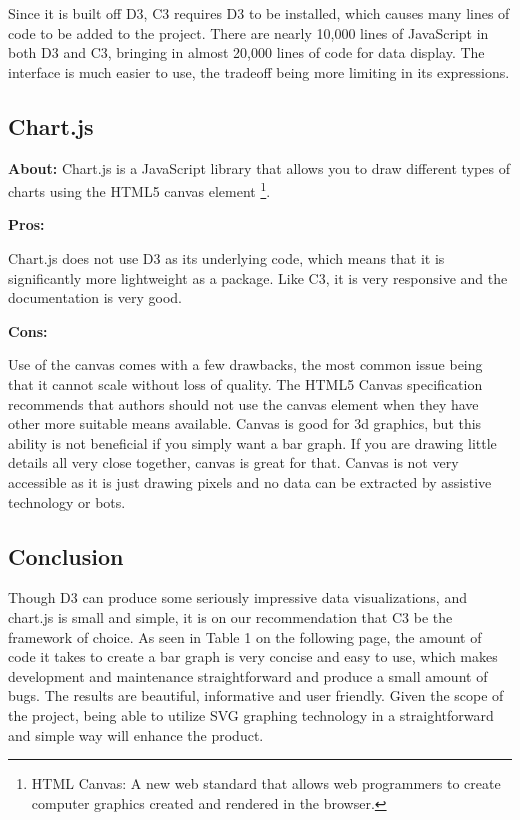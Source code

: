 \documentclass[draftclsnofoot,onecolumn,letterpaper,10pt,compsoc]{IEEEtran}
\begin{document}
  Since it is built off D3, C3 requires D3 to be installed, which causes many lines of code to be added to the project.
  There are nearly 10,000 lines of JavaScript in both D3 and C3, bringing in almost 20,000 lines of code for data display.
  The interface is much easier to use, the tradeoff being more limiting in its expressions.


  \subsection{Chart.js}
  \textbf{About:}
  Chart.js is a JavaScript library that allows you to draw different types of charts using the HTML5 canvas element
  \footnote{HTML Canvas: A new web standard that allows web programmers to create computer graphics created and rendered in the browser.}.

  \textbf{Pros:}

  Chart.js does not use D3 as its underlying code, which means that it is significantly more lightweight as a package.\cite{ChartJS} Like C3, it is very responsive and the documentation is very good.

  \textbf{Cons:}

  Use of the canvas comes with a few drawbacks, the most common issue being that it cannot scale without loss of quality.
  The HTML5 Canvas specification recommends that authors should not use the canvas element when they have other more suitable means available.\cite{CanvasVsSVG}
  Canvas is good for 3d graphics, but this ability is not beneficial if you simply want a bar graph.
  If you are drawing little details all very close together, canvas is great for that.
  Canvas is not very accessible as it is just drawing pixels and no data can be extracted by assistive technology or bots.

  \subsection{Conclusion}

  Though D3 can produce some seriously impressive data visualizations, and chart.js is small and simple, it is on our recommendation that C3 be the framework of choice.
  As seen in Table 1 on the following page, the amount of code it takes to create a bar graph is very concise and easy to use, which makes development and maintenance straightforward and produce a small amount of bugs.
  The results are beautiful, informative and user friendly.
  Given the scope of the project, being able to utilize SVG graphing technology in a straightforward and simple way will enhance the product.
\end{document}
